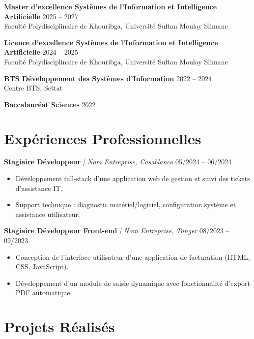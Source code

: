 \documentclass[a4paper,10pt]{article}
\begin{document}
\textbf{Master d'excellence Systèmes de l'Information et Intelligence Artificielle} \hfill 2025 -- 2027 \\
Faculté Polydisciplinaire de Khouribga, Université Sultan Moulay Slimane

\vspace{1pt}
\textbf{Licence d'excellence Systèmes de l'Information et Intelligence Artificielle} \hfill 2024 -- 2025 \\
Faculté Polydisciplinaire de Khouribga, Université Sultan Moulay Slimane

\vspace{1pt}
\textbf{BTS Développement des Systèmes d'Information} \hfill 2022 -- 2024 \\
Centre BTS, Settat

\vspace{1pt}
\textbf{Baccalauréat Sciences } \hfill 2022

\section{Expériences Professionnelles}

\textbf{Stagiaire Développeur} \textit{| Nom Entreprise, Casablanca} \hfill 05/2024 -- 06/2024
\begin{itemize}[leftmargin=*, noitemsep, topsep=2pt]
    \item Développement full-stack d'une application web de gestion et suivi des tickets d'assistance IT.
    \item Support technique : diagnostic matériel/logiciel, configuration système et assistance utilisateur.
\end{itemize}

\vspace{3pt}
\textbf{Stagiaire Développeur Front-end} \textit{| Nom Entreprise, Tanger} \hfill 08/2023 -- 09/2023
\begin{itemize}[leftmargin=*, noitemsep, topsep=2pt]
    \item Conception de l'interface utilisateur d'une application de facturation (HTML, CSS, JavaScript).
    \item Développement d'un module de saisie dynamique avec fonctionnalité d'export PDF automatique.
\end{itemize}

\section{Projets Réalisés}
\end{document}
